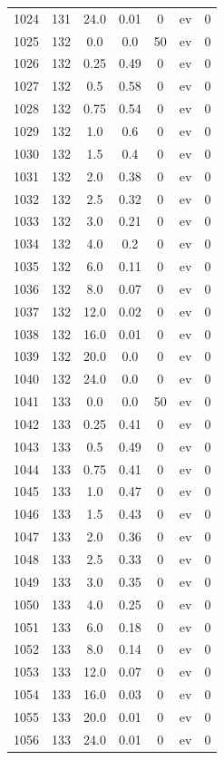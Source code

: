 \documentclass[12pt,a4paper]{article}
\begin{document}
\begin{tabular}{r|cccccc}
	1024 & 131 & 24.0 & 0.01 & 0 & ev & 0 \\
	1025 & 132 & 0.0 & 0.0 & 50 & ev & 0 \\
	1026 & 132 & 0.25 & 0.49 & 0 & ev & 0 \\
	1027 & 132 & 0.5 & 0.58 & 0 & ev & 0 \\
	1028 & 132 & 0.75 & 0.54 & 0 & ev & 0 \\
	1029 & 132 & 1.0 & 0.6 & 0 & ev & 0 \\
	1030 & 132 & 1.5 & 0.4 & 0 & ev & 0 \\
	1031 & 132 & 2.0 & 0.38 & 0 & ev & 0 \\
	1032 & 132 & 2.5 & 0.32 & 0 & ev & 0 \\
	1033 & 132 & 3.0 & 0.21 & 0 & ev & 0 \\
	1034 & 132 & 4.0 & 0.2 & 0 & ev & 0 \\
	1035 & 132 & 6.0 & 0.11 & 0 & ev & 0 \\
	1036 & 132 & 8.0 & 0.07 & 0 & ev & 0 \\
	1037 & 132 & 12.0 & 0.02 & 0 & ev & 0 \\
	1038 & 132 & 16.0 & 0.01 & 0 & ev & 0 \\
	1039 & 132 & 20.0 & 0.0 & 0 & ev & 0 \\
	1040 & 132 & 24.0 & 0.0 & 0 & ev & 0 \\
	1041 & 133 & 0.0 & 0.0 & 50 & ev & 0 \\
	1042 & 133 & 0.25 & 0.41 & 0 & ev & 0 \\
	1043 & 133 & 0.5 & 0.49 & 0 & ev & 0 \\
	1044 & 133 & 0.75 & 0.41 & 0 & ev & 0 \\
	1045 & 133 & 1.0 & 0.47 & 0 & ev & 0 \\
	1046 & 133 & 1.5 & 0.43 & 0 & ev & 0 \\
	1047 & 133 & 2.0 & 0.36 & 0 & ev & 0 \\
	1048 & 133 & 2.5 & 0.33 & 0 & ev & 0 \\
	1049 & 133 & 3.0 & 0.35 & 0 & ev & 0 \\
	1050 & 133 & 4.0 & 0.25 & 0 & ev & 0 \\
	1051 & 133 & 6.0 & 0.18 & 0 & ev & 0 \\
	1052 & 133 & 8.0 & 0.14 & 0 & ev & 0 \\
	1053 & 133 & 12.0 & 0.07 & 0 & ev & 0 \\
	1054 & 133 & 16.0 & 0.03 & 0 & ev & 0 \\
	1055 & 133 & 20.0 & 0.01 & 0 & ev & 0 \\
	1056 & 133 & 24.0 & 0.01 & 0 & ev & 0 \\

\end{tabular}
\end{document}

